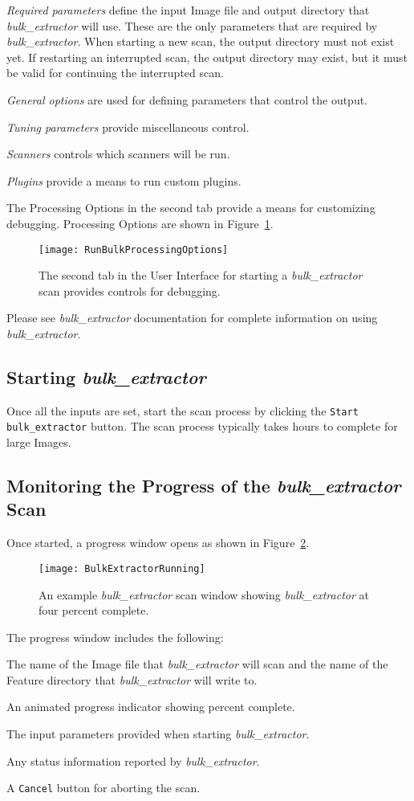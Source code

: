 \documentclass[10pt,twoside]{article}
\newcommand{\bulk}{\emph{bulk\_extractor}\xspace}
\begin{document}
\emph{Required parameters} define the input Image file and output directory that \bulk will use.
These are the only parameters that are required by \bulk.
When starting a new scan, the output directory must not exist yet.
If restarting an interrupted scan,
the output directory may exist, but it must be valid for continuing the interrupted scan.

\emph{General options} are used for defining parameters that control the output.

\emph{Tuning parameters} provide miscellaneous control.

\emph{Scanners} controls which scanners will be run.

\emph{Plugins} provide a means to run custom plugins.

The Processing Options in the second tab provide a means for customizing debugging.
Processing Options are shown in Figure~\ref{run-bulk-processing-options}.
\begin{figure}
\center
\texttt{[image: RunBulkProcessingOptions]}
\caption{The second tab in the User Interface for starting a \bulk scan
provides controls for debugging.\label{run-bulk-processing-options}}
\end{figure}

Please see \bulk documentation \cite{garfinkel:bulk-extractor}
for complete information on using \bulk.

\subsection{Starting \bulk}
Once all the inputs are set, start the scan process
by clicking the \texttt{Start bulk\_extractor} button.
The scan process typically takes hours to complete for large Images.

\subsection{Monitoring the Progress of the \bulk Scan}
Once started, a progress window opens as shown in Figure~\ref{bulk-extractor-running}.
\begin{figure}
\center
\texttt{[image: BulkExtractorRunning]}
\caption{An example \bulk scan window
showing \bulk at four percent complete.\label{bulk-extractor-running}}
\end{figure}

The progress window includes the following:
\begin{compactitem}
\item The name of the Image file that \bulk will scan
and the name of the Feature directory that \bulk will write to.
\item An animated progress indicator showing percent complete.
\item The input parameters provided when starting \bulk.
\item Any status information reported by \bulk.
\item A \texttt{Cancel} button for aborting the scan.
\end{compactitem}
\end{document}
